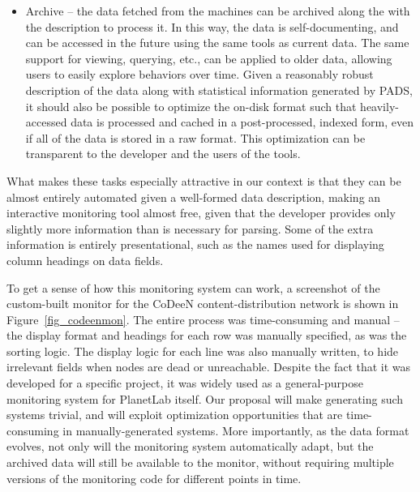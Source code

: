 \begin{itemize}
\item Archive -- the data fetched from the machines can be archived
along the with the description to process it. In this way, the data is
self-documenting, and can be accessed in the future using the same
tools as current data. The same support for viewing, querying, etc.,
can be applied to older data, allowing users to easily explore
behaviors over time. Given a reasonably robust description of the data
along with statistical information generated by PADS, it should also
be possible to optimize the on-disk format such that heavily-accessed
data is processed and cached in a post-processed, indexed form, even
if all of the data is stored in a raw format. This optimization can be
transparent to the developer and the users of the tools.

\end{itemize}

What makes these tasks especially attractive in our context is that
they can be almost entirely automated given a well-formed data
description, making an interactive monitoring tool almost free, given
that the developer provides only slightly more information than is
necessary for parsing. Some of the extra information is entirely
presentational, such as the names used for displaying column headings
on data fields.

To get a sense of how this monitoring system can work, a screenshot of
the custom-built monitor for the CoDeeN content-distribution network
is shown in Figure~\ref{fig_codeenmon}. The entire process was
time-consuming and manual -- the display format and headings for each
row was manually specified, as was the sorting logic. The display
logic for each line was also manually written, to hide irrelevant
fields when nodes are dead or unreachable. Despite the fact that it
was developed for a specific project, it was widely used as a
general-purpose monitoring system for PlanetLab itself. Our proposal
will make generating such systems trivial, and will exploit
optimization opportunities that are time-consuming in
manually-generated systems. More importantly, as the data format
evolves, not only will the monitoring system automatically adapt, but
the archived data will still be available to the monitor, without
requiring multiple versions of the monitoring code for different points
in time.
